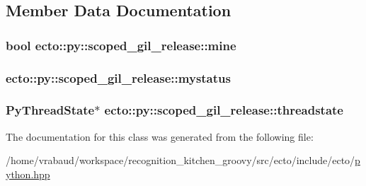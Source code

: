 \subsection{\-Member \-Data \-Documentation}
\hypertarget{classecto_1_1py_1_1scoped__gil__release_a9e9fbf0c5819ac1b706437d99a6459a3}{
\subsubsection[{mine}]{\setlength{\rightskip}{0pt plus 5cm}bool {\bf ecto\-::py\-::scoped\-\_\-gil\-\_\-release\-::mine}}}\label{classecto_1_1py_1_1scoped__gil__release_a9e9fbf0c5819ac1b706437d99a6459a3}
\hypertarget{classecto_1_1py_1_1scoped__gil__release_a888a6813c86b9bbd2d5cd0d4a0f7e2f2}{
\subsubsection[{mystatus}]{ {\bf ecto\-::py\-::scoped\-\_\-gil\-\_\-release\-::mystatus}}}\label{classecto_1_1py_1_1scoped__gil__release_a888a6813c86b9bbd2d5cd0d4a0f7e2f2}
\hypertarget{classecto_1_1py_1_1scoped__gil__release_a2ebf229b22f53b7d31b742e45b8832d8}{
\subsubsection[{threadstate}]{\setlength{\rightskip}{0pt plus 5cm}\-Py\-Thread\-State$\ast$ {\bf ecto\-::py\-::scoped\-\_\-gil\-\_\-release\-::threadstate}}}\label{classecto_1_1py_1_1scoped__gil__release_a2ebf229b22f53b7d31b742e45b8832d8}


\-The documentation for this class was generated from the following file\-:\begin{DoxyCompactItemize}
\item 
/home/vrabaud/workspace/recognition\-\_\-kitchen\-\_\-groovy/src/ecto/include/ecto/\hyperlink{python_8hpp}{python.\-hpp}\end{DoxyCompactItemize}
